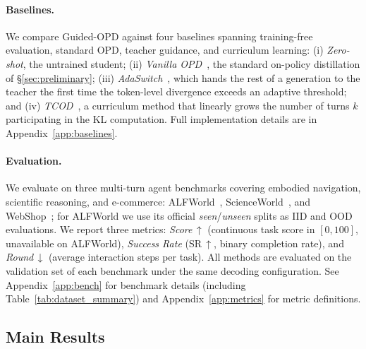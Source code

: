 \documentclass[11pt]{article}
\begin{document}
\paragraph{Baselines.}
We compare Guided-OPD against four baselines spanning training-free evaluation, standard OPD, teacher guidance, and curriculum learning: (i) \emph{Zero-shot}, the untrained student; (ii) \emph{Vanilla OPD}~\citep{opd, lu2025onpolicydistillation}, the standard on-policy distillation of \S\ref{sec:preliminary}; (iii) \emph{AdaSwitch}~\citep{AdaSwitch}, which hands the rest of a generation to the teacher the first time the token-level divergence exceeds an adaptive threshold; and (iv) \emph{TCOD}~\citep{wang2026tcod}, a curriculum method that linearly grows the number of turns $k$ participating in the KL computation. Full implementation details are in Appendix~\ref{app:baselines}.

\paragraph{Evaluation.}
We evaluate on three multi-turn agent benchmarks covering embodied navigation, scientific reasoning, and e-commerce: ALFWorld~\citep{ALFWorld}, ScienceWorld~\citep{ScienceWorld}, and WebShop~\citep{WebShop}; for ALFWorld we use its official \emph{seen}/\emph{unseen} splits as IID and OOD evaluations. We report three metrics: \emph{Score}\,$\uparrow$ (continuous task score in $[0,100]$, unavailable on ALFWorld), \emph{Success Rate} (SR\,$\uparrow$, binary completion rate), and \emph{Round}\,$\downarrow$ (average interaction steps per task). 
All methods are evaluated on the validation set of each benchmark under the same decoding configuration. 
See Appendix~\ref{app:bench} for benchmark details (including Table~\ref{tab:dataset_summary}) and Appendix~\ref{app:metrics} for metric definitions.

\subsection{Main Results}
\label{sec:exp:main}
\end{document}
